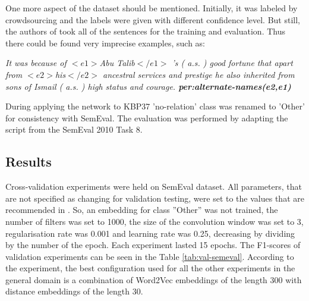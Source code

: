 One more aspect of the dataset should be mentioned. Initially, it was labeled by crowdsourcing and the labels 
were given with different confidence level. But still, the authors of \cite{DBLP:journals/corr/ZhangW15a} took all of the sentences for the training 
and evaluation. Thus there could be found very imprecise examples, such as:

\textit{It was because of $<e1>$Abu Talib$</e1>$ 's ( a.s. ) good fortune that apart from $<e2>$his$</e2>$ ancestral services and prestige he also inherited from sons of Ismail ( a.s. ) high status and courage. \textbf{per:alternate-names(e2,e1)}}

During applying the network to KBP37 'no-relation' class was renamed to 'Other' for consistency 
with SemEval. The evaluation was performed by adapting the script from the SemEval 2010 Task 8.

\subsection{Results}
Cross-validation experiments were held on SemEval dataset. All parameters, that are not specified as changing for validation testing, were set to the values 
that are recommended in \cite{DBLP:journals/corr/SantosXZ15}. So, an embedding for class 
''Other'' was not trained, the number of filters was set to 1000, the size of the convolution window was set to 3, 
regularisation rate was 0.001 and learning rate was 0.25, decreasing by dividing by the number
of the epoch. Each experiment lasted 15 epochs. The F1-scores of validation experiments can be  
seen in the Table \ref{tab:val-semeval}. According to the experiment, the best configuration used for all the other experiments in the general domain is a combination of Word2Vec embeddings of the length 300 with distance embeddings of the length 30.

